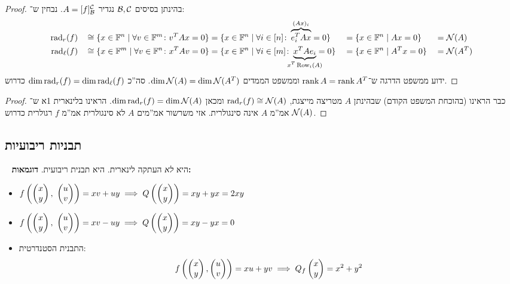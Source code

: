 \documentclass[name=רשימות אלגברה לינארית 2א]{../../../tex/classes/megasumPreamble}
\begin{document}
	\begin{proof}
		בהינתן בסיסים $\mathcal{B}, \mathcal{C}$ נגדיר $A = [f]_{\mathcal{B}}^{\mathcal{C}}$. נבחין ש־: 
		\begin{alignat*}{9}
			\rad_r(f) \,&&\cong \{x \in \F^{n} \mid \forall v \in \F^{m} \co v^TAx = 0 \} &= \{x \in \F^{n} \mid \forall i \in [n] \co \overbrace{e_i^TAx}^{\mathclap{(Ax)_i}} = 0 \} &&= \{x \in \F^n \mid Ax = 0\} &&= \nc(A) \\
			\rad_\ml(f) \,&&\cong \{x \in \F^{m} \mid \forall v \in \F^{n} \co x^TAv = 0 \} &= \{x \in \F^{n} \mid \forall i \in [m] \co \underbrace{x^TAe_i}_{\mathclap{x^T\row_i(A)}} = 0 \} &&= \{x \in \F^n \mid A^Tx = 0\} &&= \nc(A^T)
		\end{alignat*}
		ידוע ממשפט הדרגה ש־$\operatorname{rank} A = \operatorname{rank} A^T$ וממשפט הממדים $\dim \mathcal{N}(A) = \dim\mathcal{N}(A^T)$. סה''כ $\dim \operatorname{rad}_r(f) = \dim \operatorname{rad}_\ell(f)$ כדרוש. 
	\end{proof}
	
	\begin{proof}
		כבר הראינו (בהוכחת המשפט הקודם) שבהינתן $A$ מטריצה מייצגת, $\operatorname{rad}_r(f) \cong \mathcal{N}(A)$ ומכאן $\dim \operatorname{rad}_r(f) = \dim \mathcal{N}(A)$. הראינו בלינארית 1א ש־$\mathcal{N}(A)$ אמ''מ $A$ אינה סינגולרית. אזי משרשור אמ''מים $A$ לא סינגולרית אמ''מ $f$ רגולרית כדרוש. 
	\end{proof}
	
	\subsection{תבניות ריבועיות}\ 
	היא \textit{לא} העתקה לינארית. היא תבנית ריבועית. \textbf{דוגמאות: }
	\begin{itemize}
		\item \hfil $\displaystyle f\cl{\pms{x \\ y}, \ \pms{u \\ v}} = xv + uy \implies Q\cl{\pms{x \\ y}} = xy + yx = 2xy$
		\item \hfil $\displaystyle f\cl{\pms{x \\ y}, \ \pms{u \\ v}} = xv - uy \implies Q\cl{\pms{x \\ y}} = xy - yx = 0$
		\item התבנית הסטנדרטית: 
		\[ f\left ( \begin{pmatrix} x \\ y \end{pmatrix}, \begin{pmatrix} u \\ v \end{pmatrix} \right ) = xu + yv \implies Q_f\begin{pmatrix} x \\ y \end{pmatrix} = x^2 + y^2 \]
	\end{itemize}
	
\end{document}
